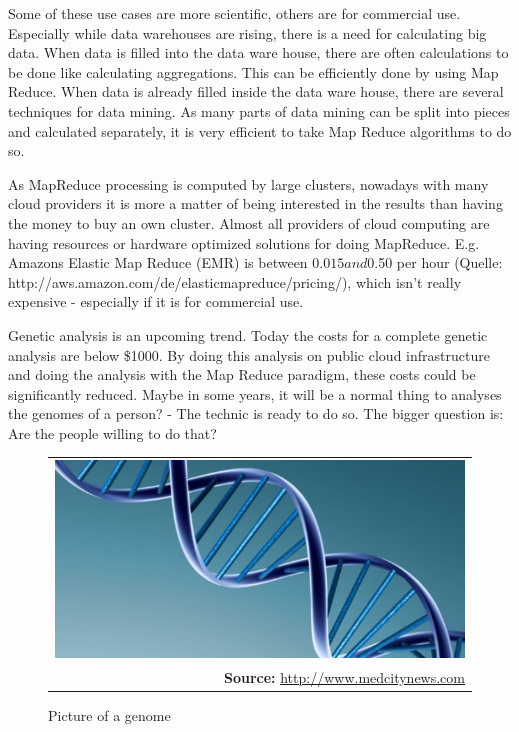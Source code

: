 Some of these use cases are more scientific, others are for commercial use. Especially while data
warehouses are rising, there is a need for calculating big data. When data is filled into the data
ware house, there are often calculations to be done like calculating aggregations. This can be
efficiently done by using Map Reduce. When data is already filled inside the data ware house, there
are several techniques for data mining. As many parts of data mining can be split into pieces and
calculated separately, it is very efficient to take Map Reduce algorithms to do so.

As MapReduce processing is computed by large clusters, nowadays with many cloud providers it is more
a matter of being interested in the results than having the money to buy an own cluster. Almost all
providers of cloud computing are having resources or hardware optimized solutions for doing
MapReduce. E.g. Amazons Elastic Map Reduce (EMR) is between $0.015 and $0.50 per hour (Quelle:
http://aws.amazon.com/de/elasticmapreduce/pricing/), which isn’t really expensive - especially if it
is for commercial use.

Genetic analysis is an upcoming trend. Today the costs for a complete genetic analysis are below
\$1000. By doing this analysis on public cloud infrastructure and doing the analysis with the Map
Reduce paradigm, these costs could be significantly reduced. Maybe in some years, it will be a
normal thing to analyses the genomes of a person? - The technic is ready to do so. The bigger
question is: Are the people willing to do that?

\begin{figure} [!htb]
	\begin{center}
		  \begin{tabular}{@{}r@{}}
		{\includegraphics[width=14cm]{images/genome.jpg}}\\
		\footnotesize\sffamily\textbf{Source:} \url{http://www.medcitynews.com}
	  		   \cite{genomePicture} 
 	 	 \end{tabular}
		\caption{Picture of a genome}
		\label{fig:genome}
	\end{center}
\end{figure}\FloatBarrier

